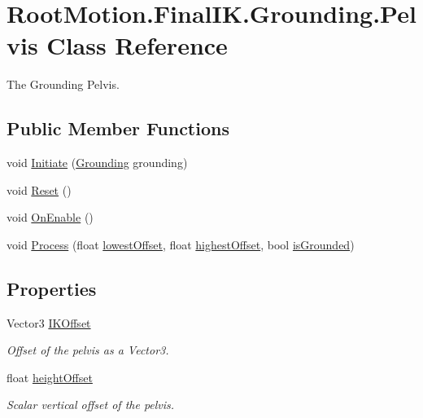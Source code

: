 \hypertarget{class_root_motion_1_1_final_i_k_1_1_grounding_1_1_pelvis}{}\section{Root\+Motion.\+Final\+I\+K.\+Grounding.\+Pelvis Class Reference}
\label{class_root_motion_1_1_final_i_k_1_1_grounding_1_1_pelvis}


The Grounding Pelvis.  


\subsection*{Public Member Functions}
\begin{DoxyCompactItemize}
\item 
void \mbox{\hyperlink{class_root_motion_1_1_final_i_k_1_1_grounding_1_1_pelvis_a3e3c24b3ad938516c507c1232943b40e}{Initiate}} (\mbox{\hyperlink{class_root_motion_1_1_final_i_k_1_1_grounding}{Grounding}} grounding)
\item 
void \mbox{\hyperlink{class_root_motion_1_1_final_i_k_1_1_grounding_1_1_pelvis_af3b30b66704249260358cb93f1b0c9f3}{Reset}} ()
\item 
void \mbox{\hyperlink{class_root_motion_1_1_final_i_k_1_1_grounding_1_1_pelvis_a575355a4e6dab60546fc367c8a3e7ee9}{On\+Enable}} ()
\item 
void \mbox{\hyperlink{class_root_motion_1_1_final_i_k_1_1_grounding_1_1_pelvis_a9a746d9d5a465372daa0acbd3af3ceb1}{Process}} (float \mbox{\hyperlink{class_root_motion_1_1_final_i_k_1_1_grounding_a6243b60cf994b4575169d94fa2a1d160}{lowest\+Offset}}, float \mbox{\hyperlink{class_root_motion_1_1_final_i_k_1_1_grounding_a4c23e0297e098daaf07ec072ab312ed4}{highest\+Offset}}, bool \mbox{\hyperlink{class_root_motion_1_1_final_i_k_1_1_grounding_a02b57261b10e29f2a4aade9940aae54c}{is\+Grounded}})
\end{DoxyCompactItemize}
\subsection*{Properties}
\begin{DoxyCompactItemize}
\item 
Vector3 \mbox{\hyperlink{class_root_motion_1_1_final_i_k_1_1_grounding_1_1_pelvis_aefc0e59c0c682ed6447099c01eec8cb9}{I\+K\+Offset}}
\begin{DoxyCompactList}\small\item\em Offset of the pelvis as a Vector3. \end{DoxyCompactList}\item 
float \mbox{\hyperlink{class_root_motion_1_1_final_i_k_1_1_grounding_1_1_pelvis_a27efcfd67fd1bb899b1484769c08a2c8}{height\+Offset}}
\begin{DoxyCompactList}\small\item\em Scalar vertical offset of the pelvis. \end{DoxyCompactList}\end{DoxyCompactItemize}


